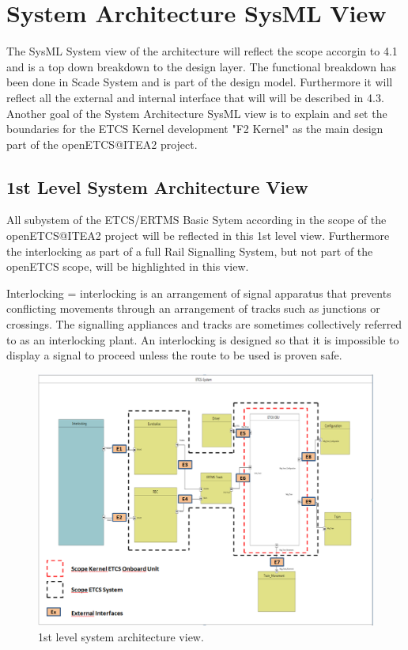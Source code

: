 \section{System Architecture SysML View}
The SysML System view of the architecture will reflect the scope accorgin to 4.1 and is a top down breakdown to the design layer. The functional breakdown has been done in Scade System and is part of the design model. Furthermore it will reflect all the external and internal interface that will will be described in 4.3. Another goal of the System Architecture SysML view is to explain and set the boundaries for the ETCS Kernel development "F2 Kernel" as the main design part of the openETCS@ITEA2 project.

\subsection{1st Level System Architecture View}
All subystem of the ETCS/ERTMS Basic Sytem according in the scope of the openETCS@ITEA2 project will be reflected in this 1st level view. Furthermore the interlocking as part of a full Rail Signalling System, but not part of the openETCS scope, will be highlighted in this view.

Interlocking =  interlocking is an arrangement of signal apparatus that prevents conflicting movements through an arrangement of tracks such as junctions or crossings. The signalling appliances and tracks are sometimes collectively referred to as an interlocking plant. An interlocking is designed so that it is impossible to display a signal to proceed unless the route to be used is proven safe.


\begin{figure}
\centering
\includegraphics[scale=0.6]{images/1stlevelarchitecture}
\caption{1st level system architecture view.}
\label{1st level System Architecture view}
\end{figure}

